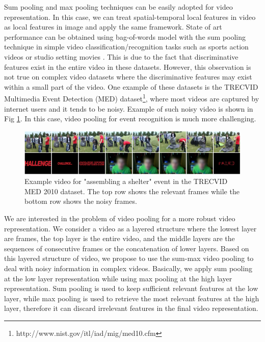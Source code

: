   
Sum pooling and max pooling techniques can be easily adopted for video representation. In this case, we can treat spatial-temporal local features in video as local features in image and apply the same framework. State of art performance can be obtained using bag-of-words model with the sum pooling technique in simple video classification/recognition tasks such as sports action videos \cite{Rodriguez2008} or studio setting movies \cite{marszalek09}. This is due to the fact that discriminative features exist in the entire video in these datasets. However, this observation is not true on complex video datasets where the discriminative features may exist within a small part of the video. One example of these datasets is the TRECVID Multimedia Event Detection (MED) dataset\footnote{http://www.nist.gov/itl/iad/mig/med10.cfm}, where most videos are captured by internet users and it tends to be noisy. Example of such noisy video is shown in Fig \ref{f_teaser}. In this case, video pooling for event recognition is much more challenging.
\begin{figure}
	\centering
	\includegraphics[width=1\textwidth]{teaser_image.png}
	\caption{Example video for "assembling a shelter" event in the TRECVID MED 2010 dataset. The top row shows the relevant frames while the bottom row shows the noisy frames.}
	\label{f_teaser}
\end{figure}

We are interested in the problem of video pooling for a more robust video representation. We consider a video as a layered structure where the lowest layer are frames, the top layer is the entire video, and the middle layers are the sequences of consecutive frames or the concatenation of lower layers. Based on this layered structure of video, we propose to use the sum-max video pooling to deal with noisy information in complex videos. Basically, we apply sum pooling at the low layer representation while using max pooling at the high layer representation. Sum pooling is used to keep sufficient relevant features at the low layer, while max pooling is used to retrieve the most relevant features at the high layer, therefore it can discard irrelevant features in the final video representation. 

